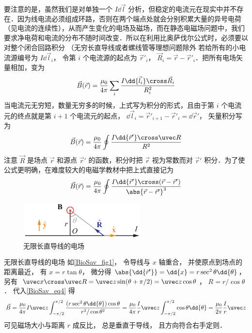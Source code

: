 要注意的是，虽然我们是对单独一个 $I\dd{\vec l}$ 分析，但稳定的电流元在现实中并不存在．因为线电流必须组成环路，否则在两个端点处就会分别积累大量的异号电荷（见电流的连续性），从而产生变化的电场及磁场，而在静态电磁场问题中，我们要求净电荷和电流的分布不随时间改变．所以在利用比奥萨伐尔公式时，必须要以对整个闭合回路积分 （无穷长直导线或者螺线管等理想问题除外%
若给所有的小电流源编号为 $I\dd{\vec l_i}$， 令第 $i$ 个电流源的起点为 $\vec r'_i$， $\vec R_i = \vec r - \vec r'_i$．把所有电场矢量相加，变为
\begin{equation}
\vec B (\vec r) = \frac{\mu_0}{4\pi} \sum\limits_i \frac{I \dd{\vec l_i} \cross \vec R_i}{R_i^2}
\end{equation}
当电流元无穷短，数量无穷多的时候，上式写为积分的形式，且由于第 $i$ 个电流元的终点就是第 $i+1$ 个电流元的起点， $\dd{\vec l_i} = \vec r'_{i + 1} - \vec r'_i = \dd{\vec r'}$， 矢量积分写为
\begin{equation}\label{BioSav_eq4}
\vec B (\vec r) = \frac{\mu_0}{4\pi} \oint \frac{I\dd{\vec r'} \cross \uvec R}{R^2}
\end{equation}
注意 $\vec R$ 是场点 $\vec r$ 和源点 $\vec r'$ 的函数，积分时把 $\vec r$ 视为常数而对 $\vec r'$ 积分．为了使公式更明确，在难度较大的电磁学教材中把上式直接记为
\begin{equation}\label{BioSav_eq1}
\vec B(\vec r) = \frac{\mu_0}{4\pi} \oint \frac{I \dd{\vec r'} \cross (\vec r - \vec r')}{\abs{\vec r - \vec r'}^3}
\end{equation}

\begin{figure}[ht]
\centering
\includegraphics[width=6.4cm]{./figures/BioSav1.pdf}
\caption{无限长直导线的电场} \label{BioSav_fig1}
\end{figure}

\begin{exam}{无限长直导线的电场}\label{BioSav_exe1}
如\autoref{BioSav_fig1}， 令导线与 $x$ 轴重合， 并使原点到场点的距离最近， 有 $x = r\tan\theta$， 微分得 $\abs{\dd{\vec r'}} = \dd{x} = r\sec^2\theta\dd{\theta}$， 另有 $\uvec x\cross\uvec R = \uvec z\sin(\theta + \pi/2) = \uvec z\cos\theta $， $R = r/\cos\theta$． 代入\autoref{BioSav_eq4} 得
\begin{equation}
\vec B = \frac{\mu_0}{4\pi} I \uvec z\int_{-\pi/2}^{\pi/2} \frac{(r \sec^2\theta \dd{\theta}) \cos\theta}{r^2/\cos\theta^2}
= \frac{\mu_0}{4\pi} \frac Ir \uvec z\int_{-\pi/2}^{\pi/2} \cos\theta \dd{\theta}
= \frac{\mu_0}{2\pi} \frac Ir\uvec z
\end{equation}
可见磁场大小与距离 $r$ 成反比， 总是垂直于导线， 且方向符合右手定则．
\end{exam}

